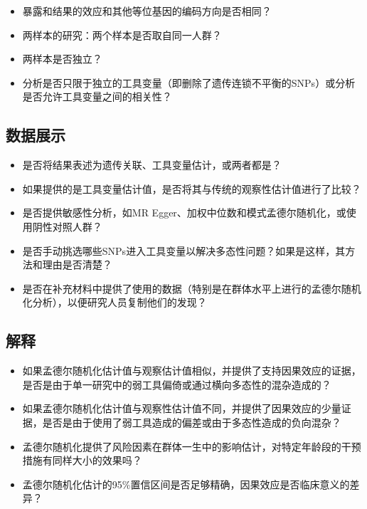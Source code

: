 \documentclass[
  chinese-hans,
  letterpaper,
  DIV=11,
  numbers=noendperiod]{scrreprt}
\providecommand{\tightlist}{%
  \setlength{\itemsep}{0pt}\setlength{\parskip}{0pt}}
\begin{document}
\begin{itemize}
\tightlist
\item
  暴露和结果的效应和其他等位基因的编码方向是否相同？
\item
  两样本的研究：两个样本是否取自同一人群？
\item
  两样本是否独立？
\item
  分析是否只限于独立的工具变量（即删除了遗传连锁不平衡的SNPs）或分析是否允许工具变量之间的相关性？
\end{itemize}

\subsection{数据展示}\label{ux6570ux636eux5c55ux793a}

\begin{itemize}
\tightlist
\item
  是否将结果表述为遗传关联、工具变量估计，或两者都是？
\item
  如果提供的是工具变量估计值，是否将其与传统的观察性估计值进行了比较？
\item
  是否提供敏感性分析，如MR
  Egger、加权中位数和模式孟德尔随机化，或使用阴性对照人群？
\item
  是否手动挑选哪些SNPs进入工具变量以解决多态性问题？如果是这样，其方法和理由是否清楚？
\item
  是否在补充材料中提供了使用的数据（特别是在群体水平上进行的孟德尔随机化分析），以便研究人员复制他们的发现？
\end{itemize}

\subsection{解释}\label{ux89e3ux91ca}

\begin{itemize}
\tightlist
\item
  如果孟德尔随机化估计值与观察估计值相似，并提供了支持因果效应的证据，是否是由于单一研究中的弱工具偏倚或通过横向多态性的混杂造成的？
\item
  如果孟德尔随机化估计值与观察性估计值不同，并提供了因果效应的少量证据，是否是由于使用了弱工具造成的偏差或由于多态性造成的负向混杂？
\item
  孟德尔随机化提供了风险因素在群体一生中的影响估计，对特定年龄段的干预措施有同样大小的效果吗？
\item
  孟德尔随机化估计的95\%置信区间是否足够精确，因果效应是否临床意义的差异？
\end{itemize}
\end{document}
